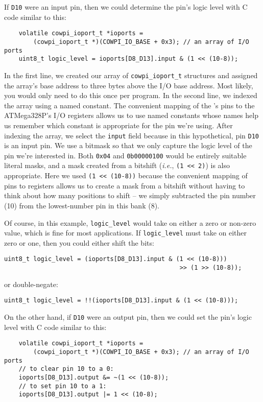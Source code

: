 If \texttt{D10} were an input pin, then we could determine the pin's logic level with C code similar to this:
\begin{lstlisting}
    volatile cowpi_ioport_t *ioports =
        (cowpi_ioport_t *)(COWPI_IO_BASE + 0x3); // an array of I/O ports
    uint8_t logic_level = ioports[D8_D13].input & (1 << (10-8));
\end{lstlisting}
In the first line, we created our array of \lstinline{cowpi_ioport_t} structures and assigned the array's base address to three bytes above the I/O base address.
Most likely, you would only need to do this once per program.
In the second line, we indexed the array using a named constant.
The convenient mapping of the \mcuboard's pins to the ATMega328P's I/O registers allows us to use named constants whose names help us remember which constant is appropriate for the pin we're using.
After indexing the array, we select the \lstinline{input} field because in this hypothetical, pin \texttt{D10} is an input pin.
We use a bitmask so that we only capture the logic level of the pin we're interested in.
Both \lstinline{0x04} and \lstinline{0b00000100} would be entirely suitable literal masks, and a mask created from a bitshift (\textit{i.e.}, \lstinline{(1 << 2)}) is also appropriate.
Here we used \lstinline{(1 << (10-8))} because the convenient mapping of pins to registers allows us to create a mask from a bitshift without having to think about how many positions to shift -- we simply subtracted the pin number (10) from the lowest-number pin in this bank (8).

Of course, in this example, \lstinline{logic_level} would take on either a zero or non-zero value, which is fine for most applications.
If \lstinline{logic_level} must take on either zero or one, then you could either shift the bits:
\begin{lstlisting}[firstnumber=3]
    uint8_t logic_level = (ioports[D8_D13].input & (1 << (10-8)))
                                                >> (1 >> (10-8));
\end{lstlisting}
or double-negate:
\begin{lstlisting}[firstnumber=3]
    uint8_t logic_level = !!(ioports[D8_D13].input & (1 << (10-8)));
\end{lstlisting}

On the other hand, if \texttt{D10} were an output pin, then we could set the pin's logic level with C code similar to this:
\begin{lstlisting}
    volatile cowpi_ioport_t *ioports =
        (cowpi_ioport_t *)(COWPI_IO_BASE + 0x3); // an array of I/O ports
    // to clear pin 10 to a 0:
    ioports[D8_D13].output &= ~(1 << (10-8));
    // to set pin 10 to a 1:
    ioports[D8_D13].output |= 1 << (10-8);
\end{lstlisting}

